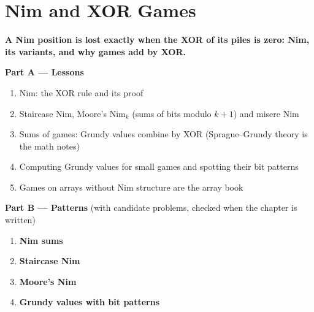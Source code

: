 \chapter{Nim and XOR Games}
\label{ch:nim}

\begin{tcolorbox}[enhanced, colback=white, colframe=secondaryblue, boxrule=1pt, arc=2mm]
\textbf{\large\textcolor{primaryblue}{A Nim position is lost exactly when the XOR of its piles is zero: Nim, its variants, and why games add by XOR.}}
\end{tcolorbox}


\begin{plannedbox}
\textbf{Part A --- Lessons}
\begin{enumerate}[leftmargin=*, label=\textbf{A\arabic*.}, itemsep=1pt]
    \item Nim: the XOR rule and its proof
    \item Staircase Nim, Moore's Nim$_k$ (sums of bits modulo $k+1$) and misere Nim
    \item Sums of games: Grundy values combine by XOR (Sprague--Grundy theory is the math notes)
    \item Computing Grundy values for small games and spotting their bit patterns
    \item Games on arrays without Nim structure are the array book
\end{enumerate}
\textbf{Part B --- Patterns} (with candidate problems, checked when the chapter is written)
\begin{enumerate}[leftmargin=*, label=\textbf{P\arabic*.}, itemsep=1pt]
    \item \textbf{Nim sums}
    \item \textbf{Staircase Nim}
    \item \textbf{Moore's Nim}
    \item \textbf{Grundy values with bit patterns}
\end{enumerate}
\end{plannedbox}
